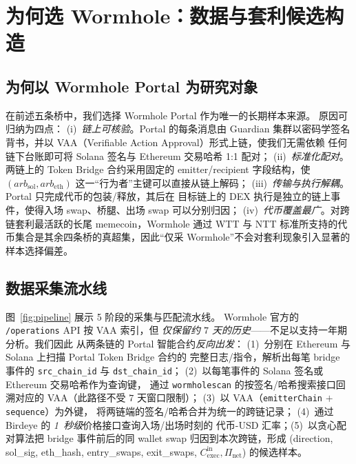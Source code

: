 \documentclass[sigconf,nonacm,10pt]{acmart}
\newcommand{\Cexec}{C_{\text{exec}}}
\newcommand{\Pnet}{\Pi_{\text{net}}}
\begin{document}
\section{为何选 Wormhole：数据与套利候选构造}
\label{sec:data}

\subsection{为何以 Wormhole Portal 为研究对象}

在前述五条桥中，我们选择 Wormhole Portal 作为唯一的长期样本来源。
原因可归纳为四点：
(i)~\emph{链上可核验}。Portal 的每条消息由 Guardian 集群以密码学签名
背书，并以 VAA（Verifiable Action Approval）形式上链，使我们无需依赖
任何链下台账即可将 Solana 签名与 Ethereum 交易哈希 1:1 配对；
(ii)~\emph{标准化配对}。两链上的 Token Bridge 合约采用固定的
emitter/recipient 字段结构，使 $(arb_{\mathrm{sol}}, arb_{\mathrm{eth}})$
这一“行为者”主键可以直接从链上解码；
(iii)~\emph{传输与执行解耦}。Portal 只完成代币的包装/释放，其后在
目标链上的 DEX 执行是独立的链上事件，使得入场 swap、桥腿、出场 swap
可以分别归因；
(iv)~\emph{代币覆盖最广}。对跨链套利最活跃的长尾 memecoin，Wormhole
通过 WTT 与 NTT 标准所支持的代币集合是其余四条桥的真超集，因此“仅采
Wormhole”不会对套利现象引入显著的样本选择偏差。

\subsection{数据采集流水线}
\label{sec:pipeline}

图~\ref{fig:pipeline} 展示 5 阶段的采集与匹配流水线。
Wormhole 官方的 \texttt{/operations} API 按 VAA 索引，但
\emph{仅保留约 $7$ 天的历史}——不足以支持一年期分析。我们因此
从两条链的 Portal 智能合约\emph{反向出发}：
(1)~分别在 Ethereum 与 Solana 上扫描 Portal Token Bridge 合约的
完整日志/指令，解析出每笔 bridge 事件的 \texttt{src\_chain\_id}
与 \texttt{dst\_chain\_id}；
(2)~以每笔事件的 Solana 签名或 Ethereum 交易哈希作为查询键，
通过 \texttt{wormholescan} 的按签名/哈希搜索接口回溯对应的
VAA（此路径不受 $7$ 天窗口限制）；
(3)~以 VAA（\texttt{emitterChain} $+$ \texttt{sequence}）为外键，
将两链端的签名/哈希合并为统一的跨链记录；
(4)~通过 Birdeye 的 \emph{1~秒级}价格接口查询入场/出场时刻的
代币-USD 汇率；(5)~以贪心配对算法把 bridge 事件前后的同 wallet
swap 归因到本次跨链，形成
(direction, sol\_sig, eth\_hash, entry\_swaps, exit\_swaps,
$\Cexec^{\text{in}}, \Pnet$) 的候选样本。
\end{document}
